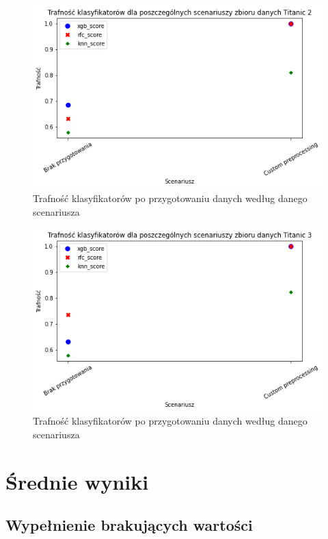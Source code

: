 \documentclass{book}
\begin{document}
\begin{figure}[H]
\centerline{\includegraphics[scale=0.5]{Titanic_2_Custom}}
\centering
\caption{Trafność klasyfikatorów po przygotowaniu danych 
według danego scenariusza}
\end{figure}

\begin{figure}[H]
\centerline{\includegraphics[scale=0.5]{Titanic_3_Custom}}
\centering
\caption{Trafność klasyfikatorów po przygotowaniu danych 
według danego scenariusza}
\end{figure}


\section{Średnie wyniki}

\subsection{Wypełnienie brakujących wartości}
\end{document}
